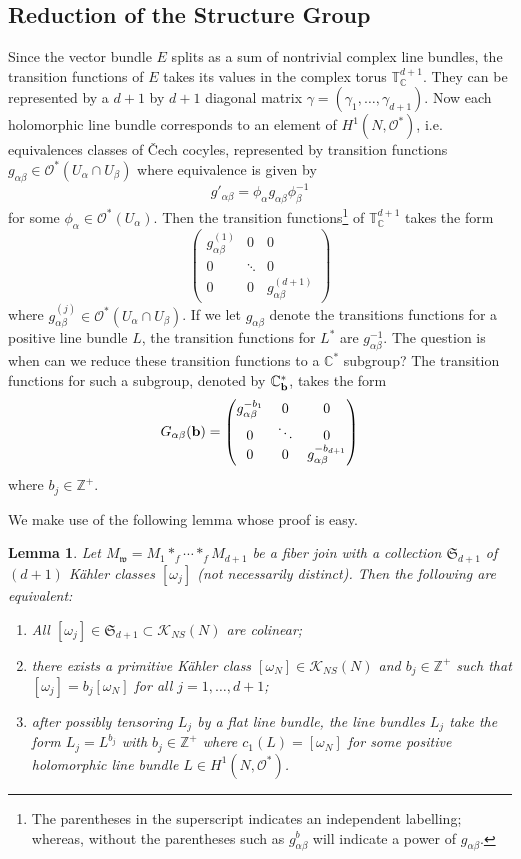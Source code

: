 \documentclass[12pt]{amsart}
\newtheorem{lemma}[theorem]{Lemma}
\def\bbc{{\mathbb C}}
\def\bbt{{\mathbb T}}
\def\bbz{{\mathbb Z}}
\def\gra{\alpha}
\def\grb{\beta}
\def\grg{\gamma}
\def\gro{\omega}
\def\bfb{{\bf b}}
\def\calo{{\mathcal O}}
\def\calk{{\mathcal K}}
\def\calo{{\mathcal O}}
\def\gw{{\mathfrak w}}
\def\gS{{\mathfrak S}}
\begin{document}
\subsection{Reduction of the Structure Group}
Since the vector bundle $E$ splits as a sum of nontrivial complex line bundles, the transition functions of $E$ takes its values in the complex torus $\bbt^{d+1}_\bbc$. They can be represented by a $d+1$ by $d+1$ diagonal matrix $\grg=(\grg_1,\ldots,\grg_{d+1})$. Now each holomorphic line bundle corresponds to an element of $H^1(N,\calo^*)$, i.e.  equivalences classes of \v{C}ech cocyles, represented by transition functions $g_{\gra\grb}\in \calo^*(U_\gra\cap U_\grb)$ where equivalence is given by 
$$g'_{\gra\grb}=\phi_\gra g_{\gra\grb}\phi^{-1}_\grb$$
for some $\phi_\gra\in\calo^*(U_\gra)$. Then the transition functions\footnote{The parentheses in the superscript indicates an independent labelling; whereas, without the parentheses such as $g^b_{\gra\grb}$ will indicate a power of $g_{\gra\grb}$.} of $\bbt^{d+1}_\bbc$ takes the form 
$$\begin{pmatrix} 
 g^{(1)}_{\gra\grb} & 0 & 0 \\
 0 & \ddots &0 \\
 0 &0 & g^{(d+1)}_{\gra\grb}
 \end{pmatrix}$$
 where $g^{(j)}_{\gra\grb}\in\calo^*(U_\gra\cap U_\grb)$. If we let $g_{\gra\grb}$ denote the transitions functions for a positive line bundle $L$, the transition functions for $L^*$ are $g^{-1}_{\gra\grb}$. The question is when can we reduce these transition functions to a $\bbc^*$ subgroup? The transition functions for such a subgroup, denoted by $\bbc^*_\bfb$, takes the form
 \begin{equation}\label{Geqn}
 G_{\gra\grb}(\bfb)=\begin{pmatrix} 
 g^{-b_1}_{\gra\grb} & 0 & 0 \\
 0 & \ddots &0 \\
 0 &0 & g^{-b_{d+1}}_{\gra\grb}
 \end{pmatrix}
 \end{equation}
where $b_j\in\bbz^+$. 
 
We make use of the following lemma whose proof is easy.  

\begin{lemma}\label{fiberjoincolinear}
Let $M_\gw=M_1*_f\cdots *_fM_{d+1}$ be a fiber join with a collection $\gS_{d+1}$ of $(d+1)$ K\"ahler classes $[\gro_j]$ (not necessarily distinct). Then the following are equivalent:
\begin{enumerate}
\item All $[\gro_j]\in\gS_{d+1}\subset \calk_{NS}(N)$ are colinear;
\item there exists a primitive K\"ahler class $[\gro_N]\in \calk_{NS}(N)$ and $b_j\in\bbz^+$ such that $[\gro_j]=b_j[\gro_N]$ for all $j=1,\ldots,d+1$;
\item after possibly tensoring $L_j$ by a flat line bundle, the line bundles $L_j$ take the form $L_j=L^{b_j}$ with $b_j\in\bbz^+$ where $c_1(L)=[\gro_N]$ for some positive holomorphic line bundle $L\in H^1(N,\calo^*)$.
\end{enumerate}
\end{lemma}
\end{document}
